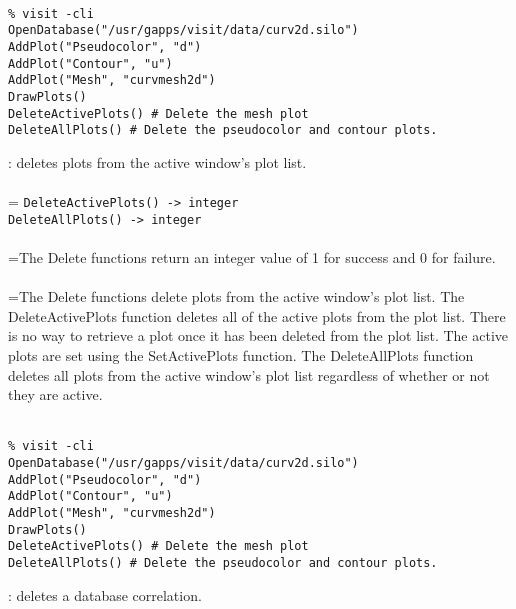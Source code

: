 \documentclass[10pt,a4paper]{report}
\begin{document}
\\[-6mm]
\begin{verbatim}% visit -cli
OpenDatabase("/usr/gapps/visit/data/curv2d.silo")
AddPlot("Pseudocolor", "d")
AddPlot("Contour", "u")
AddPlot("Mesh", "curvmesh2d")
DrawPlots()
DeleteActivePlots() # Delete the mesh plot
DeleteAllPlots() # Delete the pseudocolor and contour plots.
\end{verbatim}
\newpage


{}
: deletes plots from the active window's plot list.\\[-3mm]

 \\ 
\hangindent=\parindent 
\verb!DeleteActivePlots() -> integer!\\ 
\verb!DeleteAllPlots() -> integer!\\ [-3mm]

 \\ 
\hangindent=\parindent The Delete functions return an integer value of 1 for success and 0 for failure. \\[-3mm] 

 \\ 
\hangindent=\parindent The Delete functions delete plots from the active window's plot list. The DeleteActivePlots function deletes all of the active plots from the plot list. There is no way to retrieve a plot once it has been deleted from the plot list. The active plots are set using the SetActivePlots function. The DeleteAllPlots function deletes all plots from the active window's plot list regardless of whether or not they are active. \\[-3mm] 

\\[-6mm]
\begin{verbatim}% visit -cli
OpenDatabase("/usr/gapps/visit/data/curv2d.silo")
AddPlot("Pseudocolor", "d")
AddPlot("Contour", "u")
AddPlot("Mesh", "curvmesh2d")
DrawPlots()
DeleteActivePlots() # Delete the mesh plot
DeleteAllPlots() # Delete the pseudocolor and contour plots.
\end{verbatim}
\newpage


{}
: deletes a database correlation.\\[-3mm]
\end{document}
